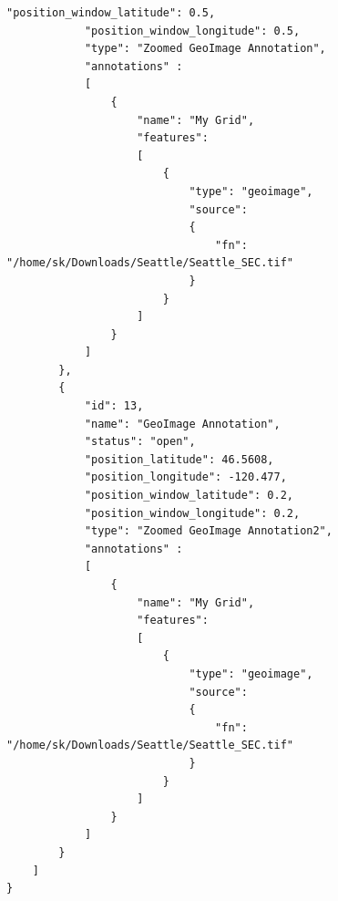 \begin{lstlisting}[basicstyle=\small\ttfamily]
            "position_window_latitude": 0.5,
            "position_window_longitude": 0.5,
            "type": "Zoomed GeoImage Annotation",
            "annotations" :
            [
                {
                    "name": "My Grid",
                    "features":
                    [
                        {
                            "type": "geoimage",
                            "source": 
                            {
                                "fn": "/home/sk/Downloads/Seattle/Seattle_SEC.tif"
                            }
                        }
                    ]
                }
            ]
        },
        {
            "id": 13,
            "name": "GeoImage Annotation",
            "status": "open",
            "position_latitude": 46.5608,
            "position_longitude": -120.477,
            "position_window_latitude": 0.2,
            "position_window_longitude": 0.2,
            "type": "Zoomed GeoImage Annotation2",
            "annotations" :
            [
                {
                    "name": "My Grid",
                    "features":
                    [
                        {
                            "type": "geoimage",
                            "source": 
                            {
                                "fn": "/home/sk/Downloads/Seattle/Seattle_SEC.tif"
                            }
                        }
                    ]
                }
            ]
        }
    ]
}

\end{lstlisting}
